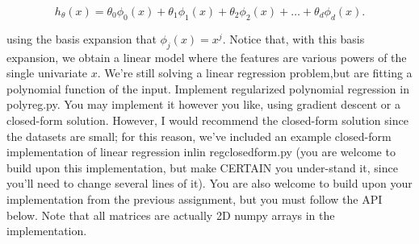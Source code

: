 \documentclass{article}
\newcommand{\1}{\mathbf{1}}
\begin{document}
$$h_\theta(x) =\theta_0\phi_0(x) + \theta_1\phi_1(x) + \theta_2\phi_2(x) + \hdots +\theta_d\phi_d(x).$$

using the basis expansion that $\phi_j(x) =x^j$. Notice that, with this basis expansion, we obtain a linear model where the features are various powers of the single univariate $x$. We’re still solving a linear regression problem,but are fitting a polynomial function of the input. Implement regularized polynomial regression in polyreg.py. You may implement it however you like, using gradient descent or a closed-form solution. However, I would recommend the closed-form solution since the datasets are small; for this reason, we’ve included an example closed-form implementation of linear regression inlin regclosedform.py (you are welcome to build upon this implementation, but make CERTAIN you under-stand it, since you’ll need to change several lines of it). You are also welcome to build upon your implementation from the previous assignment, but you must follow the API below. Note that all matrices are actually 2D numpy arrays in the implementation.
\end{document}
